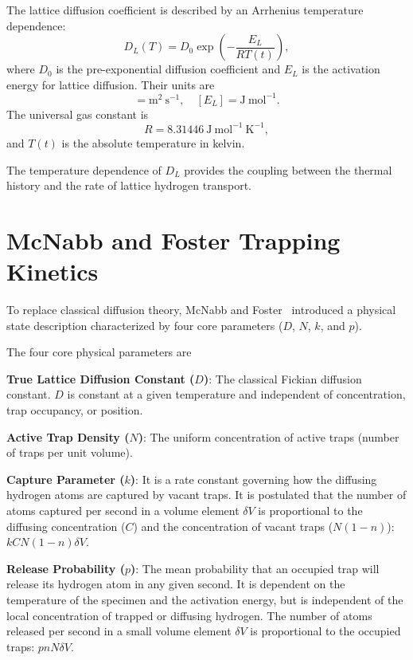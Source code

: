 \documentclass[a4paper,12pt,oneside]{report}
\begin{document}
The lattice diffusion coefficient is described by an Arrhenius temperature dependence:
\begin{equation}
D_L(T) = D_0 \exp\left( -\frac{E_L}{RT(t)} \right),
\label{eq:ch3_DL}
\end{equation}
where $D_0$ is the pre-exponential diffusion coefficient and $E_L$ is the activation energy for lattice diffusion. Their units are
\begin{equation}
[D_0] = \mathrm{m^2~s^{-1}}, \quad [E_L] = \mathrm{J~mol^{-1}}.
\label{eq:ch3_D0_units}
\end{equation}
The universal gas constant is
\begin{equation}
R = 8.31446 \mathrm{~J~mol^{-1}~K^{-1}},
\label{eq:ch3_R}
\end{equation}
and $T(t)$ is the absolute temperature in kelvin.

The temperature dependence of $D_L$ provides the coupling between the thermal history and the rate of lattice hydrogen transport.

\section{McNabb and Foster Trapping Kinetics}

To replace classical diffusion theory, McNabb and Foster~\cite{McNabb1963} introduced a physical state description characterized by four core parameters ($D$, $N$, $k$, and $p$).

The four core physical parameters are

\textbf{True Lattice Diffusion Constant ($D$)}: The classical Fickian diffusion constant. $D$ is constant at a given temperature and independent of concentration, trap occupancy, or position.

\textbf{Active Trap Density ($N$)}: The uniform concentration of active traps (number of traps per unit volume).

\textbf{Capture Parameter ($k$)}: It is a rate constant governing how the diffusing hydrogen atoms are captured by vacant traps.
It is postulated that the number of atoms captured per second in a volume element $\delta V$ is proportional to the diffusing concentration ($C$) and the concentration of vacant traps ($N(1 - n)$): $kCN(1 - n)\delta V$.

\textbf{Release Probability ($p$)}: The mean probability that an occupied trap will release its hydrogen atom in any given second. It is dependent on the temperature of the specimen and the activation energy, but is independent of the local concentration of trapped or diffusing hydrogen.
The number of atoms released per second in a small volume element $\delta V$ is proportional to the occupied traps: $pnN\delta V$.
\end{document}
